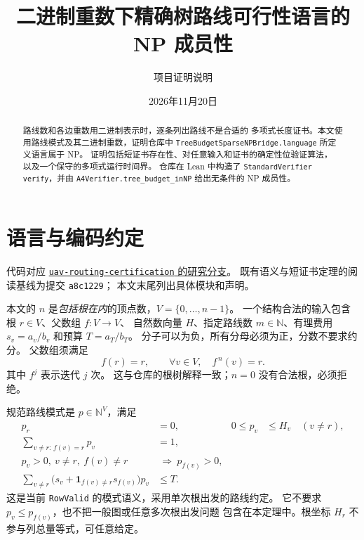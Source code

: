 \documentclass[UTF8,11pt]{ctexart}
\title{二进制重数下精确树路线可行性语言的 NP 成员性}
\author{项目证明说明}
\date{2026年11月20日}
\begin{document}
\maketitle

\begin{abstract}
路线数和各边重数用二进制表示时，逐条列出路线不是合适的
多项式长度证书。本文使用路线模式及其二进制重数，证明仓库中
\texttt{TreeBudgetSparseNPBridge.language} 所定义语言属于 NP。
证明包括短证书存在性、对任意输入和证书的确定性位验证算法，
以及一个保守的多项式运行时间界。
仓库在 Lean 中构造了 \texttt{StandardVerifier verify}，并由
\texttt{A4Verifier.tree\_budget\_inNP} 给出无条件的 NP 成员性。
\end{abstract}

\section{语言与编码约定}

代码对应
\href{https://github.com/huam54925-cpu/uav-routing-certification/tree/research/structural-service-cuts-20261023}
{\texttt{uav-routing-certification} 的研究分支}。
既有语义与短证书定理的阅读基线为提交 \texttt{a8c1229}；
本文末尾列出具体模块和声明。

本文的 $n$ 是\emph{包括根在内}的顶点数，$V=\{0,\ldots,n-1\}$。
一个结构合法的输入包含根 $r\in V$、父数组 $f:V\to V$、
自然数向量 $H$、指定路线数 $m\in\mathbb N$、有理费用
$s_v=a_v/b_v$ 和预算 $T=a_T/b_T$。
分子可以为负，所有分母必须为正，分数不要求约分。
父数组须满足
\begin{equation}\label{eq:tree}
 f(r)=r,\qquad \forall v\in V,\quad f^{\,n}(v)=r.
\end{equation}
其中 $f^j$ 表示迭代 $j$ 次。
这与仓库的根树解释一致；$n=0$ 没有合法根，必须拒绝。

规范路线模式是 $p\in\mathbb N^V$，满足
\begin{align}
 p_r&=0, &0\le p_v&\le H_v\quad(v\ne r),\label{eq:bounds}\\
 \sum_{v\ne r:\,f(v)=r}p_v&=1,\label{eq:root}\\
 p_v>0,\ v\ne r,\ f(v)\ne r&\ \Longrightarrow\ p_{f(v)}>0,\label{eq:support}\\
 \sum_{v\ne r}\bigl(s_v+\mathbf{1}_{f(v)\ne r}s_{f(v)}\bigr)p_v&\le T.
 \label{eq:budget}
\end{align}
这是当前 \texttt{RowValid} 的模式语义，采用单次根出发的路线约定。
它不要求 $p_v\le p_{f(v)}$，也不把一般图或任意多次根出发问题
包含在本定理中。根坐标 $H_r$ 不参与列总量等式，可任意给定。
\end{document}

